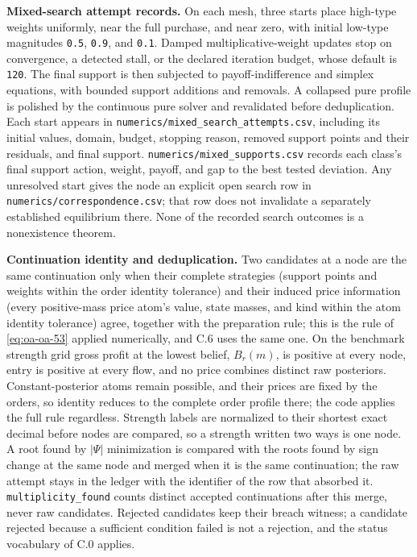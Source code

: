 \documentclass[
  11pt,
]{article}
\newcounter{none} %
\begin{document}
\textbf{Mixed-search attempt records.} On each mesh, three starts place
high-type weights uniformly, near the full purchase, and near zero, with
initial low-type magnitudes \texttt{0.5}, \texttt{0.9}, and
\texttt{0.1}. Damped multiplicative-weight updates stop on convergence,
a detected stall, or the declared iteration budget, whose default is
\texttt{120}. The final support is then subjected to payoff-indifference
and simplex equations, with bounded support additions and removals. A
collapsed pure profile is polished by the continuous pure solver and
revalidated before deduplication. Each start appears in
\texttt{numerics/mixed\_search\_attempts.csv}, including its initial
values, domain, budget, stopping reason, removed support points and
their residuals, and final support.
\texttt{numerics/mixed\_supports.csv} records each class's final support
action, weight, payoff, and gap to the best tested deviation. Any
unresolved start gives the node an explicit open search row in
\texttt{numerics/correspondence.csv}; that row does not invalidate a
separately established equilibrium there. None of the recorded search
outcomes is a nonexistence theorem.

\textbf{Continuation identity and deduplication.} Two candidates at a
node are the same continuation only when their complete strategies
(support points and weights within the order identity tolerance) and
their induced price information (every positive-mass price atom's value,
state masses, and kind within the atom identity tolerance) agree,
together with the preparation rule; this is the rule of
\eqref{eq:oa-oa-53} applied numerically, and C.6 uses the same one. On
the benchmark strength grid gross profit at the lowest belief, \(B_r(m)\), is
positive at
every node, entry is positive at every flow, and no price combines
distinct raw posteriors. Constant-posterior atoms remain possible, and
their prices are fixed by the orders, so identity reduces to the
complete order profile there; the code applies the full rule regardless.
Strength labels are normalized to their shortest exact decimal before
nodes are compared, so a strength written two ways is one node. A root
found by \(|\Psi|\) minimization is compared with the roots found by
sign change at the same node and merged when it is the same
continuation; the raw attempt stays in the ledger with the identifier of
the row that absorbed it. \texttt{multiplicity\_found} counts distinct
accepted continuations after this merge, never raw candidates. Rejected
candidates keep their breach witness; a candidate rejected because a
sufficient condition failed is not a rejection, and the status
vocabulary of C.0 applies.
\end{document}

